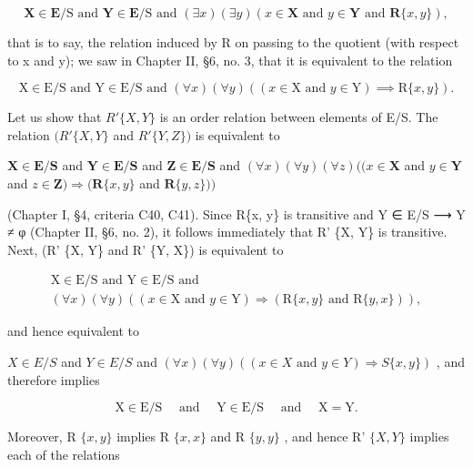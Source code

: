 \[
\mathbf {X} \in \mathbf {E} / \mathrm{S} \text { and } \mathbf {Y} \in \mathbf {E} / \mathrm{S} \text { and } (\exists x) (\exists y) (x \in \mathbf {X} \text { and } y \in \mathbf {Y} \text { and } \mathbf {R} \{x, y \}),
\]

that is to say, the relation induced by R on passing to the quotient (with respect to x and y); we saw in Chapter II, §6, no. 3, that it is equivalent to the relation

\[
\mathrm{X} \in \mathrm{E} / \mathrm{S} \text {   and   } \mathrm{Y} \in \mathrm{E} / \mathrm{S} \text {   and   } (\forall x) (\forall y) ((x \in \mathrm{X} \text {   and   } y \in \mathrm{Y}) \implies \mathrm{R} \{x, y \}).
\]

Let us show that \(R'\{X, Y\}\) is an order relation between elements of E/S. The relation \((R'\{X, Y\}\) and \(R'\{Y, Z\})\) is equivalent to

\(\mathbf{X} \in \mathbf{E} / \mathbf{S}\) and \(\mathbf{Y} \in \mathbf{E} / \mathbf{S}\) and \(\mathbf{Z} \in \mathbf{E} / \mathbf{S}\) and \((\forall x)(\forall y)(\forall z)((x \in \mathbf{X}\) and \(y \in \mathbf{Y}\) and \(z \in \mathbf{Z}) \Longrightarrow (\mathbf{R}\{x, y\}\) and \(\mathbf{R}\{y, z\}))\)

(Chapter I, §4, criteria C40, C41). Since R\{x, y\} is transitive and Y ∈ E/S ⟶ Y ≠ φ (Chapter II, §6, no. 2), it follows immediately that R' \{X, Y\} is transitive. Next, (R' \{X, Y\} and R' \{Y, X\}) is equivalent to

\[
\begin{array}{l} \mathrm{X} \in \mathrm{E} / \mathrm{S} \text { and } \mathrm{Y} \in \mathrm{E} / \mathrm{S} \text { and } \\ (\forall x) (\forall y) ((x \in \mathrm{X} \text { and } y \in \mathrm{Y}) \Longrightarrow (\mathrm{R} \{x, y \} \text { and } \mathrm{R} \{y, x \})), \end{array}
\]

and hence equivalent to

\(X \in E/S\) and \(Y \in E/S\) and \((\forall x)(\forall y)((x \in X \text{ and } y \in Y) \Longrightarrow S\{x, y\})\) , and therefore implies

\[
\mathrm{X} \in \mathrm{E} / \mathrm{S} \quad \text { and } \quad \mathrm{Y} \in \mathrm{E} / \mathrm{S} \quad \text { and } \quad \mathrm{X} = \mathrm{Y}.
\]

Moreover, R \(\{x, y\}\) implies R \(\{x, x\}\) and R \(\{y, y\}\) , and hence R' \(\{X, Y\}\) implies each of the relations

